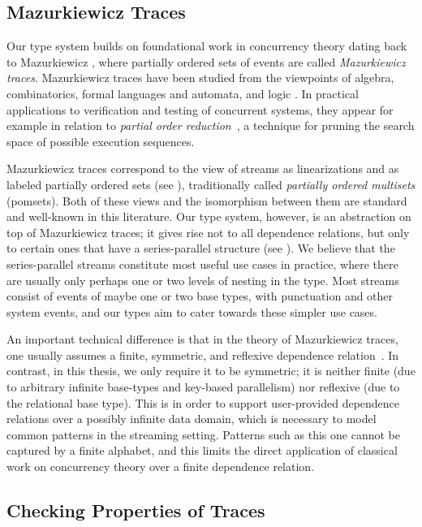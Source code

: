 \subsection{Mazurkiewicz Traces}

Our type system builds on foundational work in concurrency theory dating back to Mazurkiewicz \cite{mazurkiewicz1986trace}, where partially ordered sets of events are called \emph{Mazurkiewicz traces}. Mazurkiewicz traces have been studied from the viewpoints of algebra, combinatorics, formal languages and automata, and
logic \cite{DiekertR1995}. In practical applications to verification and
testing of concurrent systems, they appear for example in relation to
\emph{partial order reduction}~\cite{God96,Peled94}, a technique for
pruning the search space of possible execution sequences.

Mazurkiewicz traces correspond to the view of streams as linearizations and as labeled partially ordered sets (see ),
traditionally called \emph{partially ordered multisets} (pomsets).
Both of these views and the isomorphism between them are standard and well-known in this literature.
Our type system, however, is an abstraction on top of Mazurkiewicz traces; it
gives rise not to all dependence relations, but only to certain ones that have a series-parallel structure
(see ).
We believe that the series-parallel streams constitute most useful use cases in practice, where there are usually only perhaps one or two levels of nesting in the type. Most streams consist of events of maybe one or two base types, with punctuation and other system events, and our types aim to cater towards these simpler use cases.

An important technical difference is that in the theory of Mazurkiewicz traces, one usually assumes a finite, symmetric, and reflexive dependence relation~\cite{DiekertR1995}. In contrast, in this thesis, we only require it to be symmetric; it is neither finite (due to arbitrary infinite base-types and key-based parallelism) nor reflexive (due to the relational base type). This is in order to support user-provided dependence relations over a possibly infinite data domain, which is necessary to model common patterns in the streaming setting. Patterns such as this one cannot be captured by a finite alphabet, and this limits the direct application of classical work on concurrency theory over a finite dependence relation.

\subsection{Checking Properties of Traces}


